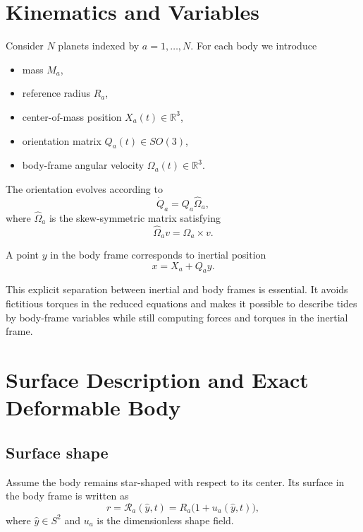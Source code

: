 \documentclass[journal, a4paper]{IEEEtran}
\begin{document}
\section{Kinematics and Variables}

Consider $N$ planets indexed by $a=1,\dots,N$. For each body we introduce
\begin{itemize}
\item mass $M_a$,
\item reference radius $R_a$,
\item center-of-mass position $X_a(t)\in\mathbb{R}^3$,
\item orientation matrix $Q_a(t)\in SO(3)$,
\item body-frame angular velocity $\Omega_a(t)\in\mathbb{R}^3$.
\end{itemize}

The orientation evolves according to
\begin{equation}
\dot Q_a = Q_a \widehat{\Omega}_a,
\label{eq:Qdot}
\end{equation}
where $\widehat{\Omega}_a$ is the skew-symmetric matrix satisfying
\begin{equation}
\widehat{\Omega}_a v = \Omega_a \times v.
\end{equation}

A point $y$ in the body frame corresponds to inertial position
\begin{equation}
x = X_a + Q_a y.
\label{eq:body-to-inertial}
\end{equation}

This explicit separation between inertial and body frames is essential. It
avoids fictitious torques in the reduced equations and makes it possible to
describe tides by body-frame variables while still computing forces and
torques in the inertial frame.

\section{Surface Description and Exact Deformable Body}

\subsection{Surface shape}

Assume the body remains star-shaped with respect to its center. Its surface
in the body frame is written as
\begin{equation}
r = \mathcal{R}_a(\hat y,t)
   = R_a\bigl(1+u_a(\hat y,t)\bigr),
\label{eq:surface}
\end{equation}
where $\hat y \in S^2$ and $u_a$ is the dimensionless shape field.
\end{document}
